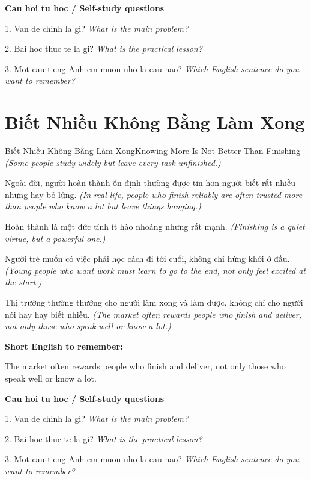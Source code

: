 \begin{tuhocnhanh}
\textbf{Cau hoi tu hoc / Self-study questions}

1. Van de chinh la gi? \textit{What is the main problem?}

2. Bai hoc thuc te la gi? \textit{What is the practical lesson?}

3. Mot cau tieng Anh em muon nho la cau nao? \textit{Which English sentence do you want to remember?}
\end{tuhocnhanh}
\ngancach

\section{Biết Nhiều Không Bằng Làm Xong}
\begin{truyen}{Biết Nhiều Không Bằng Làm Xong}{Knowing More Is Not Better Than Finishing}
\textit{(Some people study widely but leave every task unfinished.)}

Ngoài đời, người hoàn thành ổn định thường được tin hơn người biết rất nhiều nhưng hay bỏ lửng.
\textit{(In real life, people who finish reliably are often trusted more than people who know a lot but leave things hanging.)}

Hoàn thành là một đức tính ít hào nhoáng nhưng rất mạnh.
\textit{(Finishing is a quiet virtue, but a powerful one.)}

Người trẻ muốn có việc phải học cách đi tới cuối, không chỉ hứng khởi ở đầu.
\textit{(Young people who want work must learn to go to the end, not only feel excited at the start.)}

\end{truyen}

\begin{baihoc}
Thị trường thường thưởng cho người làm xong và làm được, không chỉ cho người nói hay hay biết nhiều.
\textit{(The market often rewards people who finish and deliver, not only those who speak well or know a lot.)}
\end{baihoc}

\begin{ghinhoanh}
\textbf{Short English to remember:}

The market often rewards people who finish and deliver, not only those who speak well or know a lot.

\end{ghinhoanh}

\begin{tuhocnhanh}
\textbf{Cau hoi tu hoc / Self-study questions}

1. Van de chinh la gi? \textit{What is the main problem?}

2. Bai hoc thuc te la gi? \textit{What is the practical lesson?}

3. Mot cau tieng Anh em muon nho la cau nao? \textit{Which English sentence do you want to remember?}
\end{tuhocnhanh}
\ngancach

